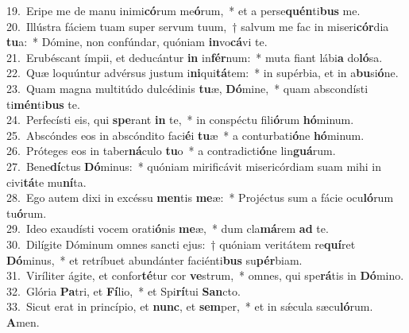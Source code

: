 {19.~}Eripe me de manu inimi\textbf{có}rum me\textbf{ó}rum,~* et a perse\textbf{quén}ti\textbf{bus} me.\\
{20.~}Illústra fáciem tuam super servum tuum,~† salvum me fac in miseri\textbf{cór}dia \textbf{tu}a:~* Dómine, non confúndar, quóniam \textbf{in}vo\textbf{cá}vi te.\\
{21.~}Erubéscant ímpii, et deducántur \textbf{in} in\textbf{fér}num:~* muta fiant lábi\textbf{a} do\textbf{ló}sa.\\
{22.~}Quæ loquúntur advérsus justum i\textbf{ni}qui\textbf{tá}tem:~* in supérbia, et in a\textbf{bu}si\textbf{ó}ne.\\
{23.~}Quam magna multitúdo dulcédinis \textbf{tu}æ, \textbf{Dó}mine,~* quam abscondísti ti\textbf{mén}ti\textbf{bus} te.\\
{24.~}Perfecísti eis, qui \textbf{spe}rant \textbf{in} te,~* in conspéctu fili\textbf{ó}rum \textbf{hó}minum.\\
{25.~}Abscóndes eos in abscóndito faci\textbf{é}i \textbf{tu}æ~* a conturbati\textbf{ó}ne \textbf{hó}minum.\\
{26.~}Próteges eos in taber\textbf{ná}culo \textbf{tu}o~* a contradicti\textbf{ó}ne lin\textbf{guá}rum.\\
{27.~}Bene\textbf{dí}ctus \textbf{Dó}minus:~* quóniam mirificávit misericórdiam suam mihi in civi\textbf{tá}te mu\textbf{ní}ta.\\
{28.~}Ego autem dixi in excéssu \textbf{men}tis \textbf{me}æ:~* Projéctus sum a fácie ocu\textbf{ló}rum tu\textbf{ó}rum.\\
{29.~}Ideo exaudísti vocem orati\textbf{ó}nis \textbf{me}æ,~* dum cla\textbf{má}rem \textbf{ad} te.\\
{30.~}Dilígite Dóminum omnes sancti ejus:~† quóniam veritátem re\textbf{quí}ret \textbf{Dó}minus,~* et retríbuet abundánter faciénti\textbf{bus} su\textbf{pér}biam.\\
{31.~}Viríliter ágite, et confor\textbf{té}tur cor \textbf{ve}strum,~* omnes, qui spe\textbf{rá}tis in \textbf{Dó}mino.\\
{32.~}Glória \textbf{Pa}tri, et \textbf{Fí}lio,~* et Spi\textbf{rí}tui \textbf{San}cto.\\
{33.~}Sicut erat in princípio, et \textbf{nunc}, et \textbf{sem}per,~* et in sǽcula sæcu\textbf{ló}rum. \textbf{A}men.\\
